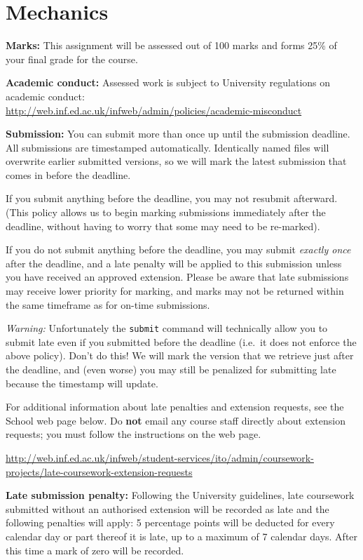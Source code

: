 \documentclass[11pt,]{article}
\begin{document}
\section{Mechanics}
\label{sec:mechanics}

\textbf{Marks:} 
This assignment will be assessed out of 100 marks and
forms 25\% of your final grade for the course.

\textbf{Academic conduct:} 
Assessed work is subject to University
regulations on academic
conduct:\\\url{http://web.inf.ed.ac.uk/infweb/admin/policies/academic-misconduct}

\textbf{Submission:} 
You can submit more than once up until the submission deadline. All
submissions are timestamped automatically. Identically named files
will overwrite earlier submitted versions, so we will mark the latest
submission that comes in before the deadline.

If you submit anything before the deadline, you may not resubmit
afterward. (This policy allows us to begin marking submissions
immediately after the deadline, without having to worry that some may
need to be re-marked).

If you do not submit anything before the deadline, you may submit {\em
exactly once} after the deadline, and a late penalty will be applied
to this submission unless you have received an approved extension.
Please be aware that late submissions may receive lower priority for
marking, and marks may not be returned within the same timeframe as
for on-time submissions.

{\em Warning:} Unfortunately the \verb+submit+ command will technically
allow you to submit late even if you submitted before the deadline
(i.e.\ it does not enforce the above policy). Don't do this! We will
mark the version that we retrieve just after the deadline, and (even
worse) you may still be penalized for submitting late because the
timestamp will update.

For additional information about late penalties and extension
requests, see the School web page below. Do {\bf not} email any course
staff directly about extension requests; you must follow the
instructions on the web page.

\url{http://web.inf.ed.ac.uk/infweb/student-services/ito/admin/coursework-projects/late-coursework-extension-requests}

\textbf{Late submission penalty:}  
Following the University guidelines, 
late coursework submitted without an authorised extension will be
recorded as late and the following penalties will apply: 5
percentage points will be deducted for every calendar day or part
thereof it is late, up to a maximum of 7 calendar days. After this
time a mark of zero will be recorded.
\end{document}
